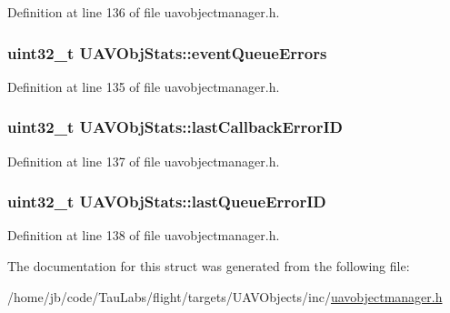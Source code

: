 \-Definition at line 136 of file uavobjectmanager.\-h.

\hypertarget{struct_u_a_v_obj_stats_a0dc695f48120e441e86ad99fe656627a}{
\subsubsection[{event\-Queue\-Errors}]{\setlength{\rightskip}{0pt plus 5cm}uint32\-\_\-t {\bf \-U\-A\-V\-Obj\-Stats\-::event\-Queue\-Errors}}}\label{struct_u_a_v_obj_stats_a0dc695f48120e441e86ad99fe656627a}


\-Definition at line 135 of file uavobjectmanager.\-h.

\hypertarget{struct_u_a_v_obj_stats_ac3961ffa474982b4c8678fcfd240476f}{
\subsubsection[{last\-Callback\-Error\-I\-D}]{\setlength{\rightskip}{0pt plus 5cm}uint32\-\_\-t {\bf \-U\-A\-V\-Obj\-Stats\-::last\-Callback\-Error\-I\-D}}}\label{struct_u_a_v_obj_stats_ac3961ffa474982b4c8678fcfd240476f}


\-Definition at line 137 of file uavobjectmanager.\-h.

\hypertarget{struct_u_a_v_obj_stats_a7ad7134bdc6a7f7807b8387a71f507a0}{
\subsubsection[{last\-Queue\-Error\-I\-D}]{\setlength{\rightskip}{0pt plus 5cm}uint32\-\_\-t {\bf \-U\-A\-V\-Obj\-Stats\-::last\-Queue\-Error\-I\-D}}}\label{struct_u_a_v_obj_stats_a7ad7134bdc6a7f7807b8387a71f507a0}


\-Definition at line 138 of file uavobjectmanager.\-h.



\-The documentation for this struct was generated from the following file\-:\begin{DoxyCompactItemize}
\item 
/home/jb/code/\-Tau\-Labs/flight/targets/\-U\-A\-V\-Objects/inc/\hyperlink{targets_2_u_a_v_objects_2inc_2uavobjectmanager_8h}{uavobjectmanager.\-h}\end{DoxyCompactItemize}
